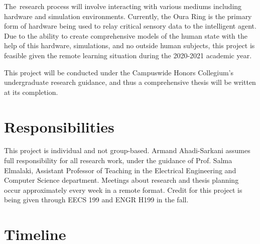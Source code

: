 \documentclass[12pt]{article}
\renewcommand{\_}{\kern-1.5pt\textunderscore\kern-1.5pt}
\begin{document}
\vspace{\baselineskip}
The\ research process will involve interacting with various mediums including hardware and  simulation environments. Currently, the Oura Ring is the primary form of hardware being used to relay critical sensory data to the intelligent agent. Due to the ability to create comprehensive models of the human state with the help of this hardware, simulations, and no outside human subjects, this project is feasible given the remote learning situation during the 2020-2021 academic year. \par


\vspace{\baselineskip}
This project will be conducted under the Campuswide Honors Collegium’s undergraduate research guidance, and thus a comprehensive thesis will be written at its completion.\par

\section{Responsibilities}
This project is individual and not group-based. Armand Ahadi-Sarkani assumes full responsibility for all research work, under the guidance of Prof. Salma Elmalaki, Assistant Professor of Teaching in the Electrical Engineering and Computer Science department. Meetings about research and thesis planning occur approximately every week in a remote format. Credit for this project is being given through EECS 199 and ENGR H199 in the fall. \par

\section{Timeline}

\vspace{\baselineskip}
\vspace{-1em}


\end{document}
